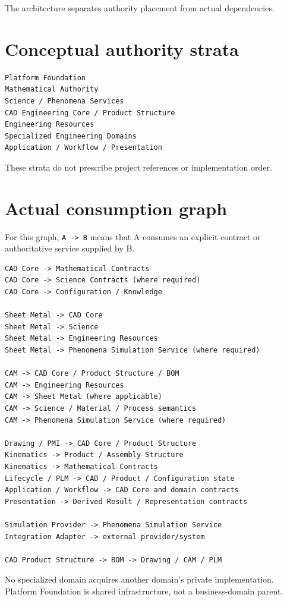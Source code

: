 \documentclass[11pt,a4paper]{report}
\begin{document}
The architecture separates authority placement from actual dependencies.

\section{Conceptual authority strata}

\begin{lstlisting}
Platform Foundation
Mathematical Authority
Science / Phenomena Services
CAD Engineering Core / Product Structure
Engineering Resources
Specialized Engineering Domains
Application / Workflow / Presentation
\end{lstlisting}

These strata do not prescribe project references or implementation order.

\section{Actual consumption graph}

For this graph, \texttt{A -> B} means that A consumes an explicit contract or authoritative service supplied by B.

\begin{lstlisting}
CAD Core -> Mathematical Contracts
CAD Core -> Science Contracts (where required)
CAD Core -> Configuration / Knowledge

Sheet Metal -> CAD Core
Sheet Metal -> Science
Sheet Metal -> Engineering Resources
Sheet Metal -> Phenomena Simulation Service (where required)

CAM -> CAD Core / Product Structure / BOM
CAM -> Engineering Resources
CAM -> Sheet Metal (where applicable)
CAM -> Science / Material / Process semantics
CAM -> Phenomena Simulation Service (where required)

Drawing / PMI -> CAD Core / Product Structure
Kinematics -> Product / Assembly Structure
Kinematics -> Mathematical Contracts
Lifecycle / PLM -> CAD / Product / Configuration state
Application / Workflow -> CAD Core and domain contracts
Presentation -> Derived Result / Representation contracts

Simulation Provider -> Phenomena Simulation Service
Integration Adapter -> external provider/system

CAD Product Structure -> BOM -> Drawing / CAM / PLM
\end{lstlisting}

No specialized domain acquires another domain's private implementation. Platform Foundation is shared infrastructure, not a business-domain parent.
\end{document}
